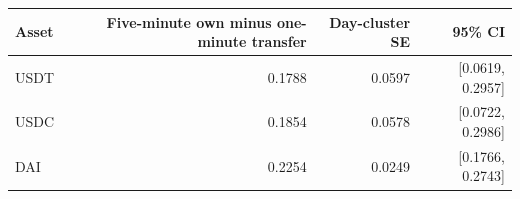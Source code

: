 \begin{tabular}{lrrr}
\toprule
Asset & Five-minute own minus one-minute transfer & Day-cluster SE & 95\% CI\\
\midrule
USDT & 0.1788 & 0.0597 & [0.0619, 0.2957] \tabularnewline
USDC & 0.1854 & 0.0578 & [0.0722, 0.2986] \tabularnewline
DAI & 0.2254 & 0.0249 & [0.1766, 0.2743] \tabularnewline
\bottomrule
\end{tabular}
